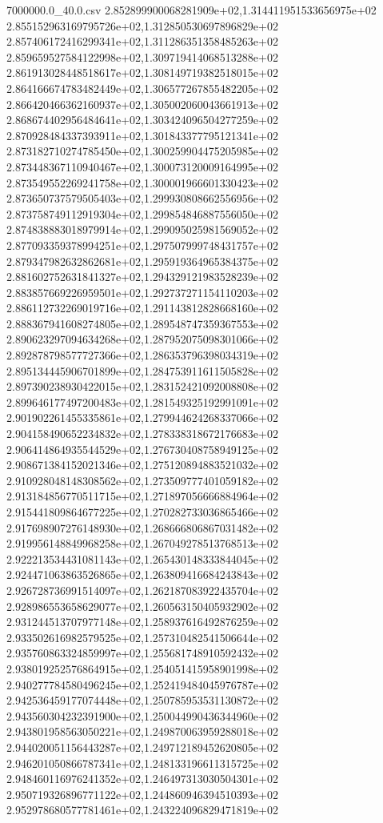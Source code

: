 \begin{filecontents*}{7000000.0_40.0.csv}
2.852899900068281909e+02,1.314411951533656975e+02
2.855152963169795726e+02,1.312850530697896829e+02
2.857406172416299341e+02,1.311286351358485263e+02
2.859659527584122998e+02,1.309719414068513288e+02
2.861913028448518617e+02,1.308149719382518015e+02
2.864166674783482449e+02,1.306577267855482205e+02
2.866420466362160937e+02,1.305002060043661913e+02
2.868674402956484641e+02,1.303424096504277259e+02
2.870928484337393911e+02,1.301843377795121341e+02
2.873182710274785450e+02,1.300259904475205985e+02
2.873448367110940467e+02,1.300073120009164995e+02
2.873549552269241758e+02,1.300001966601330423e+02
2.873650737579505403e+02,1.299930808662556956e+02
2.873758749112919304e+02,1.299854846887556050e+02
2.874838883018979914e+02,1.299095025981569052e+02
2.877093359378994251e+02,1.297507999748431757e+02
2.879347982632862681e+02,1.295919364965384375e+02
2.881602752631841327e+02,1.294329121983528239e+02
2.883857669226959501e+02,1.292737271154110203e+02
2.886112732269019716e+02,1.291143812828668160e+02
2.888367941608274805e+02,1.289548747359367553e+02
2.890623297094634268e+02,1.287952075098301066e+02
2.892878798577727366e+02,1.286353796398034319e+02
2.895134445906701899e+02,1.284753911611505828e+02
2.897390238930422015e+02,1.283152421092008808e+02
2.899646177497200483e+02,1.281549325192991091e+02
2.901902261455335861e+02,1.279944624268337066e+02
2.904158490652234832e+02,1.278338318672176683e+02
2.906414864935544529e+02,1.276730408758949125e+02
2.908671384152021346e+02,1.275120894883521032e+02
2.910928048148308562e+02,1.273509777401059182e+02
2.913184856770511715e+02,1.271897056666884964e+02
2.915441809864677225e+02,1.270282733036865466e+02
2.917698907276148930e+02,1.268666806867031482e+02
2.919956148849968258e+02,1.267049278513768513e+02
2.922213534431081143e+02,1.265430148333844045e+02
2.924471063863526865e+02,1.263809416684243843e+02
2.926728736991514097e+02,1.262187083922435704e+02
2.928986553658629077e+02,1.260563150405932902e+02
2.931244513707977148e+02,1.258937616492876259e+02
2.933502616982579525e+02,1.257310482541506644e+02
2.935760863324859997e+02,1.255681748910592432e+02
2.938019252576864915e+02,1.254051415958901998e+02
2.940277784580496245e+02,1.252419484045976787e+02
2.942536459177074448e+02,1.250785953531130872e+02
2.943560304232391900e+02,1.250044990436344960e+02
2.943801958563050221e+02,1.249870063959288018e+02
2.944020051156443287e+02,1.249712189452620805e+02
2.946201050866787341e+02,1.248133196611315725e+02
2.948460116976241352e+02,1.246497313030504301e+02
2.950719326896771122e+02,1.244860946394510393e+02
2.952978680577781461e+02,1.243224096829471819e+02

\end{filecontents*}

